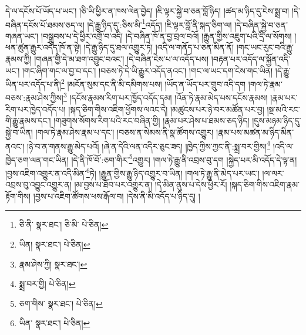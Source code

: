 དེ་ལ་དངོས་པོ་ཡོད་པ་ཡང་། །ཅི་ཡི་ཕྱིར་ན་ཁས་ལེན་བྱེད། །ཇི་ལྟར་སྐྱེ་བ་ཅན་བློ་ཉིད། །ཚད་མ་ཉིད་དུ་ངེས་སྨྲ་བ། །དེ་བཞིན་དངོས་པོ་ཐམས་ཅད་ལ། །དེ་རྒྱུ་ཉིད་དུ་:ཅིས་མི་\footnote{ཅི་ནི་  སྣར་ཐང་། ཅི་མི་  པེ་ཅིན། }འདོད། །ཇི་ལྟར་བློ་ནི་སྐད་ཅིག་ལ། །དེ་བཞིན་སྐྱེ་བ་ཅན་གཞན་ཡང་། །བསྒྲུབས་པ་དེ་ཕྱིར་འགྲོ་བ་འདི། །དེ་བཞིན་ཁོ་ན་བྱ་བྲལ་བའོ། །རྒྱུན་གྱིས་འཇུག་པའི་དྲི་ལ་སོགས། །ཕན་ཚུན་རྒྱུར་འདོད་ཁོ་ན་སྟེ། །དེ་རྒྱུ་ཉིད་དུ་ཐལ་འགྱུར་ཏེ། །འདི་ལ་གནོད་པ་ཅན་མིན་ནོ། །གང་ཡང་རུང་བའི་རྒྱུ་རྣམས་ཀྱི། །གཞན་གྱི་དེ་མ་ཐག་འབྱུང་བའང་། །དེ་བཞིན་ངེས་པ་ལ་འདོད་པས། །བརྟན་པར་འདོད་ལ་སྐྱོན་འདི་ཡང་། །གང་ཞིག་གང་ལ་བྱ་བ་དང་། །བཅས་ཏེ་དེ་ཡི་རྒྱུར་འདོད་ནའང་། །གང་ལ་ཡང་དག་ངེས་གང་ཡིན། །དེ་རྒྱུ་ཡིན་པར་འདོད་པ་ནི།\footnote{ཡིན།  སྣར་ཐང་།  པེ་ཅིན། } །མངོན་སུམ་དང་ནི་མི་དམིགས་པས། །ཡོད་ན་ཡོད་པར་གྲུབ་འདི་དག །གལ་ཏེ་རྣམ་བཅས་:རྣམ་ཤེས་ཀྱིས།\footnote{རྣམ་ཤེས་ཀྱི།  སྣར་ཐང་། } །དངོས་རྣམས་རིག་པར་ཁྱོད་འདོད་དམ། །འོན་ཏེ་རྣམ་མེད་པས་དངོས་རྣམས། །རྣམ་པར་རིག་པར་ཁྱེད་འདོད་པ། །སྐད་ཅིག་གིས་འཇིག་ཕྱོགས་ལའང་དེ། །མཚུངས་པར་ཉེ་བར་མཚོན་པར་བྱ། །སྔ་མའི་རང་གི་རྒྱུ་རྣམས་དང་། །གཟུགས་སོགས་རིག་པའི་རང་བཞིན་གྱི། །རྣམ་པར་ཤེས་པ་ཐམས་ཅད་ཉིད། །དུས་མཉམ་ཉིད་དུ་སྐྱེ་བ་ཡིན། །གལ་ཏེ་རྣམ་ཤེས་རྣམ་པ་དང་། །བཅས་ན་སེམས་ནི་སྣ་ཚོགས་འགྱུར། །རྣམ་པས་མཚན་མ་ཉིད་མིན་ནའང་། །ཉེ་བ་ན་གནས་རྒྱུ་མེད་པའོ། །ཞེ་ན་དེའི་ལན་འདིར་ཅུང་ཟད། །ཁྱེད་ཀྱིས་ཀྱང་ནི་:སྨྲ་བར་གྱིས།\footnote{སྨྲ་བར་གྱི།  པེ་ཅིན། } །འདི་ལ་ཁྱེད་ཅག་ལན་གང་ཡིན། །དེ་ནི་ཁོ་བོ་:ཅག་གིར་\footnote{ཅག་གིས་  སྣར་ཐང་།  པེ་ཅིན། }འགྱུར། །གལ་ཏེ་རྒྱུ་ནི་འབྲས་བུ་དག །སྐྱེད་པར་མི་འདོད་དེ་ལྟ་ན། །བྱས་འཇིག་འགྱུར་ན་འདི་མིན་\footnote{ཡིན་  སྣར་ཐང་།  པེ་ཅིན། }ཏེ། །རྒྱུན་གྱིས་རྒྱུ་ཉིད་འགྱུར་བ་ཡིན། །གལ་ཏེ་རྒྱུ་ནི་མེད་པར་ཡང་། །ལ་ལར་འབྲས་བུ་འབྱུང་འགྱུར་ན། །མ་བྱས་པ་ཐོབ་པར་འགྱུར་ན། །དེ་མིན་ནུས་པ་དེས་ཕྱིར་རོ། །སྐད་ཅིག་གིས་འཇིག་རྣམ་རྟོག་གིས། །བྱས་པ་འཇིག་ཚོགས་ཕས་རྒོལ་བ། །དེས་ནི་མི་འདོད་པ་ཉིད་དུ། །
